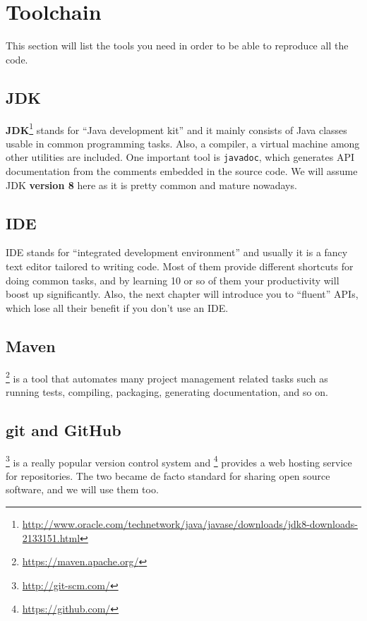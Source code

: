 \section{Toolchain}
This section will list the tools you need in order to be able to reproduce all the code.

\subsection{JDK}
\textbf{JDK}\footnote{\url{http://www.oracle.com/technetwork/java/javase/downloads/jdk8-downloads-2133151.html}} stands for ``Java development kit'' and it mainly consists of Java classes usable in common programming tasks. Also, a compiler, a virtual machine among other utilities are included. One important tool is \texttt{javadoc}, which generates API documentation from the comments embedded in the source code. We will assume JDK \textbf{version 8} here as it is pretty common and mature nowadays.

\subsection{IDE}
IDE stands for ``integrated development environment'' and usually it is a fancy text editor tailored to writing code. Most of them provide different shortcuts for doing common tasks, and by learning 10 or so of them your productivity will boost up significantly. Also, the next chapter will introduce you to ``fluent'' APIs, which lose all their benefit if you don't use an IDE. 

\subsection{Maven}
\Maven\footnote{\url{https://maven.apache.org/}} is a tool that automates many project management related tasks such as running tests, compiling, packaging, generating documentation, and so on. 

\subsection{git and GitHub}
\git\footnote{\url{http://git-scm.com/}} is a really popular version control system and \GH\footnote{\url{https://github.com/}}  provides a web hosting service for \git repositories. The two became de facto standard for sharing open source software, and we will use them too.